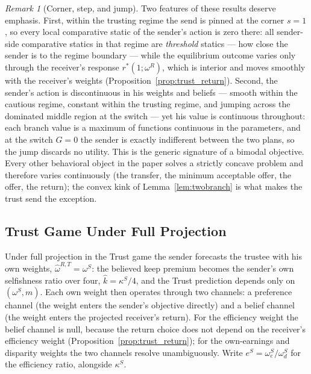 \documentclass[11pt]{article}
\theoremstyle{plain}
\theoremstyle{remark}
\newtheorem{remark}{Remark}
\begin{document}
\begin{remark}[Corner, step, and jump]
Two features of these results deserve emphasis.  First, within the trusting regime the send is pinned at the corner $s=1$, so every local comparative static of the sender's action is zero there: all sender-side comparative statics in that regime are \emph{threshold} statics --- how close the sender is to the regime boundary --- while the equilibrium outcome varies only through the receiver's response $r^\ast(1;\omega^R)$, which is interior and moves smoothly with the receiver's weights (Proposition~\ref{prop:trust_return}).  Second, the sender's action is discontinuous in his weights and beliefs --- smooth within the cautious regime, constant within the trusting regime, and jumping across the dominated middle region at the switch --- yet his value is continuous throughout: each branch value is a maximum of functions continuous in the parameters, and at the switch $G=0$ the sender is exactly indifferent between the two plans, so the jump discards no utility.  This is the generic signature of a bimodal objective.  Every other behavioral object in the paper solves a strictly concave problem and therefore varies continuously (the transfer, the minimum acceptable offer, the offer, the return); the convex kink of Lemma~\ref{lem:twobranch} is what makes the trust send the exception.
\end{remark}

\subsection{Trust Game Under Full Projection}

Under full projection in the Trust game the sender forecasts the trustee with his own weights, $\hat\omega^{R,T}=\omega^S$: the believed keep premium becomes the sender's own selfishness ratio over four, $\hat k=\kappa^S/4$, and the Trust prediction depends only on $(\omega^S,m)$.  Each own weight then operates through two channels: a preference channel (the weight enters the sender's objective directly) and a belief channel (the weight enters the projected receiver's return).  For the efficiency weight the belief channel is null, because the return choice does not depend on the receiver's efficiency weight (Proposition~\ref{prop:trust_return}); for the own-earnings and disparity weights the two channels resolve unambiguously.  Write $e^S=\omega_e^S/\omega_d^S$ for the efficiency ratio, alongside $\kappa^S$.
\end{document}
